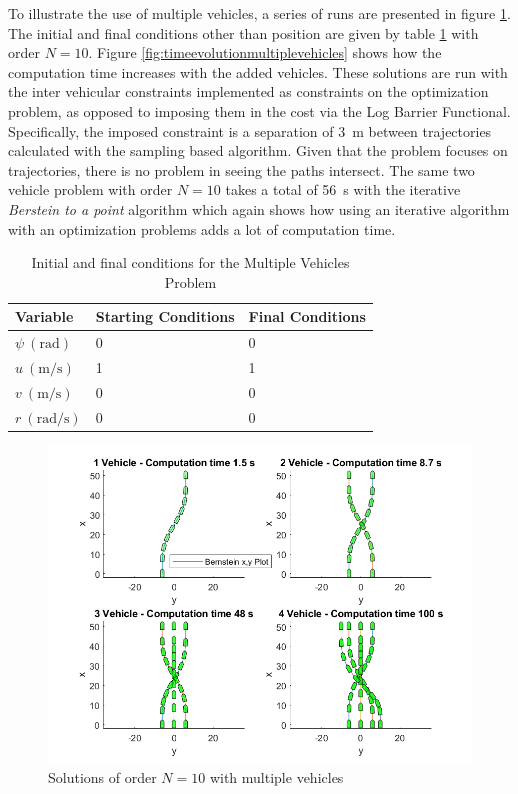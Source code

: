 \par To illustrate the use of multiple vehicles, a series of runs are presented in figure \ref{fig:multiplevehicles}. The initial and final conditions other than position are given by table \ref{tab:multivehconditions} with order $N=10$. Figure \ref{fig:timeevolutionmultiplevehicles} shows how the computation time increases with the added vehicles. These solutions are run with the inter vehicular constraints implemented as constraints on the optimization problem, as opposed to imposing them in the cost via the Log Barrier Functional. Specifically, the imposed constraint is a separation of \SI{3}{\meter} between trajectories calculated with the sampling based algorithm. Given that the problem focuses on trajectories, there is no problem in seeing the paths intersect. The same two vehicle problem with order $N=10$ takes a total of \SI{56}{\second} with the iterative \textit{Berstein to a point} algorithm which again shows how using an iterative algorithm with an optimization problems adds a lot of computation time.
\begin{table}[h!]
\centering
\begin{tabular}{|l|l|l|}
\hline
Variable & Starting Conditions & Final Conditions \\ \hline
$\psi\ (\si{\radian})$ & 0 & 0 \\
$u\ (\si{\meter\per\second})$ & 1 & 1 \\
$v\ (\si{\meter\per\second})$ & 0 & 0 \\
$r\ (\si{\radian\per\second})$ & 0 & 0 \\
\hline
\end{tabular}
\caption{Initial and final conditions for the Multiple Vehicles Problem}
\label{tab:multivehconditions}
\end{table}



\begin{figure}[h!]
\centering
\includegraphics[width=\textwidth]{Images/results/multiplevehicles.png}
\caption{Solutions of order $N=10$ with multiple vehicles}
\label{fig:multiplevehicles}
\end{figure}

